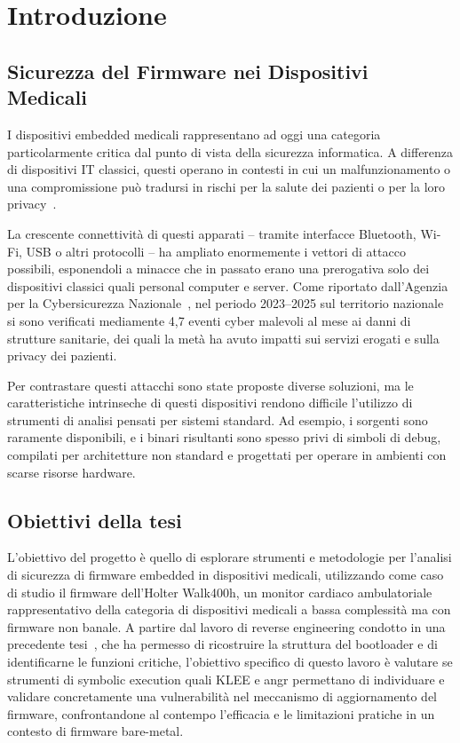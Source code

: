 \chapter{Introduzione}
\label{chap:intro}
\section{Sicurezza del Firmware nei Dispositivi Medicali}
\label{subsec:Sicurezza_del_Firmware}
I dispositivi embedded medicali rappresentano ad oggi una categoria particolarmente critica dal punto di
vista della sicurezza informatica. A differenza di dispositivi IT classici, questi operano in contesti in cui
un malfunzionamento o una compromissione può tradursi in rischi per la salute dei pazienti o per la loro
privacy~\cite{halperin2008pacemakers}.

La crescente connettività di questi apparati -- tramite interfacce Bluetooth, Wi-Fi, USB o altri protocolli
-- ha ampliato enormemente i vettori di attacco possibili, esponendoli a minacce che in passato erano una
prerogativa solo dei dispositivi classici quali personal computer e server. Come riportato dall'Agenzia
per la Cybersicurezza Nazionale~\cite{acn2025}, nel periodo 2023--2025 sul territorio nazionale si sono
verificati mediamente 4,7 eventi cyber malevoli al mese ai danni di strutture sanitarie, dei quali la metà
ha avuto impatti sui servizi erogati e sulla privacy dei pazienti.

Per contrastare questi attacchi sono state proposte diverse soluzioni, ma le caratteristiche intrinseche di
questi dispositivi rendono difficile l'utilizzo di strumenti di analisi pensati per sistemi standard. Ad
esempio, i sorgenti sono raramente disponibili, e i binari risultanti sono spesso privi di simboli di debug,
compilati per architetture non standard e progettati per operare in ambienti con scarse risorse hardware.

\section{Obiettivi della tesi}
\label{subsec:obiettivi_tesi}
L’obiettivo del progetto è quello di esplorare strumenti e metodologie per l’analisi di sicurezza di firmware embedded in dispositivi medicali, utilizzando come caso di studio il firmware dell’Holter Walk400h, un monitor cardiaco ambulatoriale rappresentativo della categoria di dispositivi medicali a bassa complessità ma con firmware non banale. 
A partire dal lavoro di reverse engineering condotto in
una precedente tesi~\cite{alberici26}, che ha permesso di ricostruire la struttura del bootloader e di
identificarne le funzioni critiche, l'obiettivo specifico di questo lavoro è valutare se strumenti di symbolic
execution quali KLEE e angr permettano di individuare e validare concretamente una vulnerabilità nel
meccanismo di aggiornamento del firmware, confrontandone al contempo l'efficacia e le limitazioni pratiche
in un contesto di firmware bare-metal.

